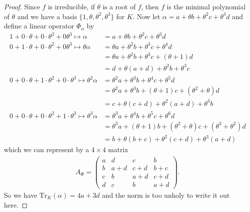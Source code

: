 \begin{example}
\begin{enumerate}
\begin{proof}
            Since \(f\) is irreducible, if \(\theta\) is a root of \(f\), then \(f\) is the minimal polynomial of \(\theta\) and we have a basis \(\{1, \theta, \theta^2, \theta^3\}\) for \(K\). Now let \(\alpha = a + \theta b + \theta^2 c + \theta^3 d\) and define a linear operator \(\Phi_\alpha\) by
            \begin{align*}
                1 + 0 \cdot \theta + 0 \cdot \theta^2 + 0 \theta^3 \mapsto \alpha &= a + \theta b + \theta^2 c + \theta^3 d \\
                0 + 1 \cdot \theta + 0 \cdot \theta^2 + 0 \theta^3 \mapsto \theta \alpha &= \theta a + \theta^2 b + \theta^3 c + \theta^4 d \\
                &= \theta a + \theta^2 b + \theta^3 c + (\theta + 1) d \\
                &= d + \theta (a + d) + \theta^2 b + \theta^3 c \\
                0 + 0 \cdot \theta + 1 \cdot \theta^2 + 0 \cdot \theta^3 \mapsto \theta^2 \alpha &= \theta^2 a + \theta^3 b + \theta^4 c + \theta^5 d \\
                &= \theta^2 a + \theta^3 b + (\theta + 1) c + (\theta^2 + \theta) d \\
                &= c + \theta (c + d) + \theta^2 (a + d) + \theta^3 b \\
                0 + 0 \cdot \theta + 0 \cdot \theta^2 + 1 \cdot \theta^3 \mapsto \theta^3 \alpha &= \theta^3 a + \theta^4 b + \theta^5 c + \theta^6 d \\
                &= \theta^3 a + (\theta + 1) b + (\theta^2 + \theta) c + (\theta^3 + \theta^2) d \\
                &= b + \theta (b + c) + \theta^2 (c + d) + \theta^3 (a + d)
            \end{align*}
            which we can represent by a \(4 \times 4\) matrix
            \begin{align*}
                A_\Phi = \begin{pmatrix}
                    a & d & c & b \\
                    b & a + d & c + d & b + c \\
                    c & b & a + d & c + d \\
                    d & c & b & a + d
                \end{pmatrix} \text{.}
            \end{align*}
            So we have \(\mathrm{Tr}_K(\alpha) = 4a + 3d\) and the norm is too unholy to write it out here.
        \end{proof}
    \end{enumerate}
\end{example}

